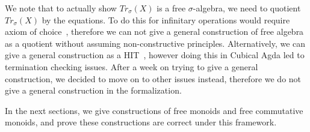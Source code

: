 We note that to actually show $Tr_\sigma(X)$ is a free $\sigma$-algebra,
we need to quotient $Tr_\sigma(X)$ by the equations. To do this for
infinitary operations would require axiom of choice~\cite{blassWordsFreeAlgebras1983},
therefore we can not give a general construction of free algebra as a quotient
without assuming non-constructive principles. Alternatively, we can give
a general construction as a HIT~\cite{univalentfoundationsprogramHomotopyTypeTheory2013},
however doing this in Cubical Agda led to termination checking issues.
After a week on trying to give a general construction, we decided to
move on to other issues instead, therefore we do not give a general
construction in the formalization.

In the next sections, we give constructions of 
free monoids and free commutative monoids, and prove these constructions
are correct under this framework.